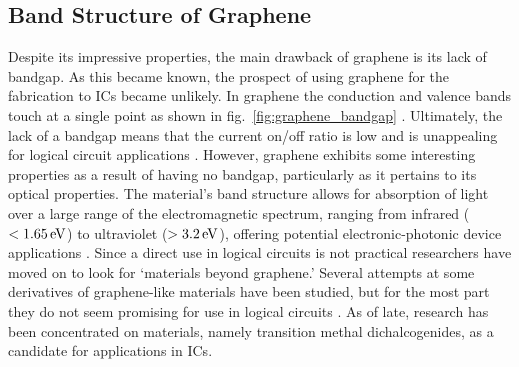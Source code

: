 \subsection{Band Structure of Graphene}\label{subsec:graphene_bandstructure}
\noindent Despite its impressive properties, the main drawback of graphene is its lack of bandgap. As this became known, the prospect of using graphene for the fabrication to \acp{IC} became unlikely. In graphene the conduction and valence bands touch at a single point as shown in fig.~\ref{fig:graphene_bandgap} \cite{Wallace_PhysRev1947}. Ultimately, the lack of a bandgap means that the current on/off ratio is low and is unappealing for logical circuit applications \cite{Xu_ChemRev2013}. However, graphene exhibits some interesting properties as a result of having no bandgap, particularly as it pertains to its optical properties. The material's band structure allows for absorption of light over a large range of the electromagnetic spectrum, ranging from infrared ($<1.65\,\mathrm{eV}$) to ultraviolet ($>3.2\,\mathrm{eV}$), offering potential electronic-photonic device applications \cite{Xia_NatureNano2009,Wang_Science2008,Geim_NatureComm2011}. Since a direct use in logical circuits is not practical researchers have moved on to look for `\td materials beyond graphene.' Several attempts at some derivatives of graphene-like materials have been studied, but for the most part they do not seem promising for use in logical circuits \cite{Takeda_PhysRev1994,Cahangirov_PhysRevLett2009}. As of late, research has been concentrated on \td materials, namely transition methal dichalcogenides, as a candidate for applications in \acp{IC}.

